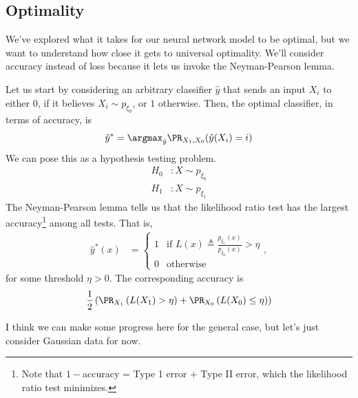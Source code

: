 \documentclass{article}
\begin{document}
\subsection*{Optimality}
We've explored what it takes for our neural network model to be optimal, but we want to understand how close it gets to universal optimality.
We'll consider accuracy instead of loss because it lets us invoke the Neyman-Pearson lemma.

Let us start by considering an arbitrary classifier $\hat{y}$ that sends an input $X_i$ to either $0$, if it believes $X_i \sim p_{\xi_0}$, or $1$ otherwise.
Then, the optimal classifier, in terms of accuracy, is
\begin{align*}
  \hat{y}^* = \argmax_{\hat{y}} \PR_{X_1,X_0}( \hat{y}(X_i) = i )
\end{align*}
We can pose this as a hypothesis testing problem.
\begin{align*}
  H_0 &: X \sim p_{\xi_0} \\
  H_1 &: X \sim p_{\xi_1}
\end{align*}
The Neyman-Pearson lemma tells us that the likelihood ratio test has the largest accuracy\footnote{Note that $1 - $accuracy = Type 1 error $+$ Type II error, which the likelihood ratio test minimizes.} among all tests.
That is,
\begin{align*}
  \hat{y}^*(x) &= 
  \begin{cases}
    1 & \text{if } L(x) \triangleq \frac{ p_{\xi_1}(x) }{ p_{\xi_0}(x) } > \eta \\
    0 & \text{otherwise}  
  \end{cases},
\end{align*}
for some threshold $\eta > 0$.
The corresponding accuracy is
\begin{align*}
  \frac{1}{2} \left( \PR_{X_1}\left( L(X_1) > \eta \right) + \PR_{X_0} \left( L(X_0) \leq \eta \right) \right)
\end{align*}

I think we can make some progress here for the general case, but let's just consider Gaussian data for now.
\end{document}
